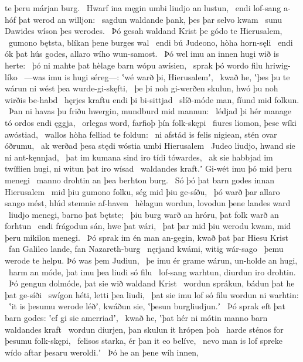 te þeru márjan burg. \hld\ Hwarf ina męgin umbi
liudjo an lustun, \hld\ endi lof-sang a-hóf
þat werod an willjon: \hld\ sagdun waldande þank,
þes þar selvo kwam \hld\ sunu Dawides
wíson þes werodes. \hld\ Þó gesah waldand Krist
þe gódo te Hierusalem, \hld\ gumono bętsta,
blíkan þene burges wal \hld\ endi bú Judeono,
hòha horn-sęli \hld\ endi ók þat hús godes,
allaro wího wun-samost. \hld\ Þó wel imu an innen
hugi wið is herte: \hld\ þó ni mahte þat hèlage barn
wópu awísien, \hld\ sprak þó wordo filu
hriwig-líko \hld\ —was imu is hugi séreg—:
ʽwé warð þi, Hierusalemʼ, \hld\ kwað he, ʽþes þu te wárun ni wést
þea wurde-gi-skęfti, \hld\ þe þi noh gi-werðen skulun,
hwó þu noh wirðis be-habd \hld\ hęrjes kraftu
endi þi bi-sittjad \hld\ slíð-móde man,
fíund mid folkun. \hld\ Þan ni havas þu friðu hwergin,
mundburd mid mannun: \hld\ lédjad þi hér manage tó
ordos endi ęggja, \hld\ orlegas word,
farfioþ þín folk-skępi \hld\ fiures liomon,
þese wíki awóstiad, \hld\ wallos hòha
felliad te foldun: \hld\ ni afstád is felis nigiean,
stén ovar óðrumu, \hld\ ak werðad þesa stędi wóstia
umbi Hierusalem \hld\ Judeo liudjo,
hwand sie ni ant-kęnnjad, \hld\ þat im kumana sind
iro tídi tówardes, \hld\ ak sie habbjad im twíflien hugi,
ni witun þat iro wísad \hld\ waldandes kraft.ʼ
Gi-wét imu þó mid þeru menegi \hld\ manno drohtin
an þea berhton burg. \hld\ Só þó þat barn godes
innan Hierusalem \hld\ mid þiu gumono folku,
ség mid þiu ge-síðu, \hld\ þó warð þar allaro sango mést,
hlúd stemnie af-haven \hld\ hèlagun wordun,
lovodun þene landes ward \hld\ liudjo menegi,
barno þat bętste; \hld\ þiu burg warð an hróru,
þat folk warð an forhtun \hld\ endi frágodun sán,
hwe þat wári, \hld\ þat þar mid þiu werodu kwam,
mid þeru mikilon menegi. \hld\ Þó sprak im én man an-gegin,
kwað þat þar Hiesu Krist \hld\ fan Galileo lande,
fan Nazareth-burg \hld\ nęrjand kwámi,
witig wár-sago \hld\ þemu werode te helpu.
Þó was þem Judiun, \hld\ þe imu ér grame wárun,
un-holde an hugi, \hld\ harm an móde,
þat imu þea liudi só filu \hld\ lof-sang warhtun,
diurdun iro drohtin. \hld\ Þó gengun dolmóde,
þat sie wið waldand Krist \hld\ wordun sprákun,
bádun þat he þat ge-síði \hld\ swígon héti,
letti þea liudi, \hld\ þat sie imu lof só filu
wordun ni warhtin: \hld\ ʽit is þesumu werode léðʼ, kwáðun sie,
ʽþesun burgliudjun.ʼ \hld\ Þó sprak eft þat barn godes:
ʽef gi sie amerriadʼ, \hld\ kwað he, ʽþat hér ni mótin manno barn
waldandes kraft \hld\ wordun diurjen,
þan skulun it hrópen þoh \hld\ harde sténos
for þesumu folk-skępi, \hld\ felisos starka,
ér þan it eo belíve, \hld\ nevo man is lof spreke
wído aftar þesaru weroldi.ʼ \hld\ Þó he an þene wíh innen,

